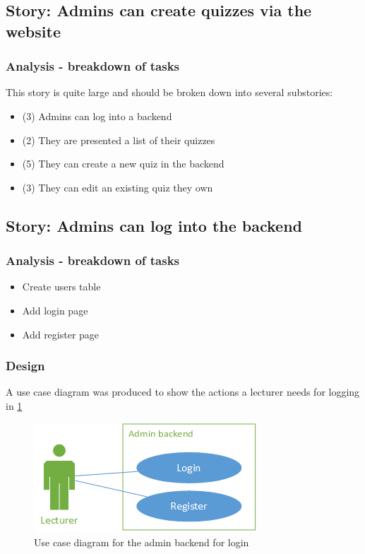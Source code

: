 \subsection{Story: Admins can create quizzes via the website}
\subsubsection{Analysis - breakdown of tasks}
This story is quite large and should be broken down into several substories:
\begin{itemize}
	\item (3) Admins can log into a backend
	\item (2) They are presented a list of their quizzes
	\item (5) They can create a new quiz in the backend
	\item (3) They can edit an existing quiz they own
\end{itemize}
\newpage

\subsection{Story: Admins can log into the backend}
\subsubsection{Analysis - breakdown of tasks}
\begin{itemize}
	\item Create users table
	\item Add login page
	\item Add register page
\end{itemize}
\subsubsection{Design}
A use case diagram was produced to show the actions a lecturer needs for logging in \ref{fig:login-use-case}

\begin{figure}
	\caption{Use case diagram for the admin backend for login}
	\centerline{\includegraphics{Chapter2/Iter-1/iter-1-use-case}}
	\label{fig:login-use-case}
\end{figure}

